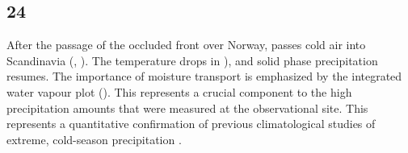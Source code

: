 \subsection*{\SI{24}{\dec}}
After the passage of the occluded front over Norway, passes cold air into Scandinavia (, ).
The temperature drops in ), and solid phase precipitation resumes. The importance of moisture transport is emphasized by the integrated water vapour plot (). This represents a crucial component to the high precipitation amounts that were measured at the observational site. This represents a quantitative confirmation of previous climatological studies of extreme, cold-season precipitation \citep[][unpublished]{azad_extreme_2017,moore_large_2018}. 

